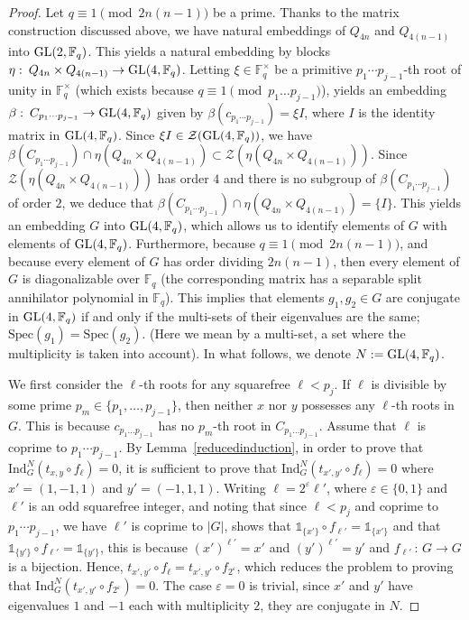 \documentclass[12pt]{amsart}
\numberwithin{equation}{section}
\newcommand{\GL}{{\rm GL}}
\newcommand{\F}{\mathbb F}
\theoremstyle{definition}
\theoremstyle{remark}
\begin{document}
\begin{proof}
    Let $q\equiv 1 \pmod{2n(n-1)}$ be a prime. Thanks to the matrix construction discussed above, we have natural embeddings of $Q_{4n}$ and $Q_{4(n-1)}$ into $\GL(2, \F_q)$. This yields a natural embedding by blocks $\eta\, \colon\,  Q_{4n}\times Q_{4(n-1)}\to \GL(4,\F_q)$. Letting $\xi\in \F_q^{\times}$ be a primitive $p_1\cdots p_{j-1}$-th root of unity in $\F_q^\times$ (which exists because $q\equiv 1\pmod{p_1\dots p_{j-1}}$), yields an embedding $\beta \, \colon\,  C_{p_1\cdots p_{j-1}}\to \GL(4,\F_q)$ given by $\beta(c_{p_1\cdots p_{j-1}})=\xi I$, where $I$ is the identity matrix in $\GL(4,\F_q)$. Since $\xi I\in \mathcal{Z}(\GL(4,\F_q))$, we have $\beta( C_{p_1\cdots p_{j-1}})\cap \eta (Q_{4n}\times Q_{4(n-1)})\subset \mathcal{Z}(\eta(Q_{4n}\times Q_{4(n-1)}))$. Since $\mathcal{Z}(\eta(Q_{4n}\times Q_{4(n-1)}))$ has order $4$ and there is no subgroup of $\beta( C_{p_1\cdots p_{j-1}})$ of order $2$, we deduce that $\beta( C_{p_1\cdots p_{j-1}})\cap \eta (Q_{4n}\times Q_{4(n-1)})=\{I\}$. This yields an embedding $G$ into $\GL(4, \F_q)$, which allows us to identify elements of $G$ with elements of $\GL(4, \F_q)$. Furthermore, because $q\equiv 1 \pmod{2n(n-1)}$, and because every element of $G$ has order dividing $2n(n-1)$, then every element of $G$ is diagonalizable over $\F_q$ (the corresponding matrix has a separable split annihilator polynomial in $\F_q$). This implies that elements $g_1,g_2 \in G$ are conjugate in $\GL(4, \F_q)$ if and only if the multi-sets of their eigenvalues are the same; $\mathrm{Spec}(g_1)=\mathrm{Spec}(g_2)$. (Here we mean by a multi-set, a set where the multiplicity is taken into account). In what follows, we denote $N:=\GL(4,\F_q)$.

    We first consider the $\ell$-th roots for any squarefree $\ell<p_j$. If $\ell$ is divisible by some prime $p_m\in \{p_1, \dots, p_{j-1}\}$, then neither $x$ nor $y$ possesses any $\ell$-th roots in $G$. This is because $c_{p_1\dots p_{j-1}}$ has no $p_m$-th root in $C_{p_1\dots p_{j-1}}$. Assume that $\ell$ is coprime to $p_1\cdots p_{j-1}$. By Lemma~\ref{reducedinduction}, in order to prove that $\mathrm{Ind}_G^N(t_{x,y}\circ f_\ell)=0$, it is sufficient to prove that $\mathrm{Ind}_G^N(t_{x',y'}\circ f_\ell)=0$ where $x'=(1,-1,1)$ and $y'=(-1,1,1)$. Writing $\ell=2^{\varepsilon}\ell'$, where $\varepsilon\in\{0,1\}$ and $\ell'$ is an odd squarefree integer, and noting that since $\ell<p_j$ and coprime to $p_1\cdots p_{j-1}$, we have $\ell'$ is coprime to $|G|$, shows that $\mathds{1}_{\{x'\}}\circ f_{\ell'}=\mathds{1}_{\{x'\}}$ and that $\mathds{1}_{\{y'\}} \circ f_{\ell'}=\mathds{1}_{\{y'\}}$, this is because $(x')^{\ell'}=x'$ and $(y')^{\ell'}=y'$ and $f_{\ell'}\, \colon\,  G\to G$ is a bijection. Hence, $t_{x',y'}\circ f_\ell=t_{x',y'}\circ f_{2^\varepsilon}$, which reduces the problem to proving that $\mathrm{Ind}_G^N(t_{x',y'}\circ f_{2^\varepsilon})=0$. The case $\varepsilon=0$ is trivial, since $x'$ and $y'$ have eigenvalues $1$ and $-1$ each with multiplicity $2$, they are conjugate in $N$.
    

\end{proof}
\end{document}
